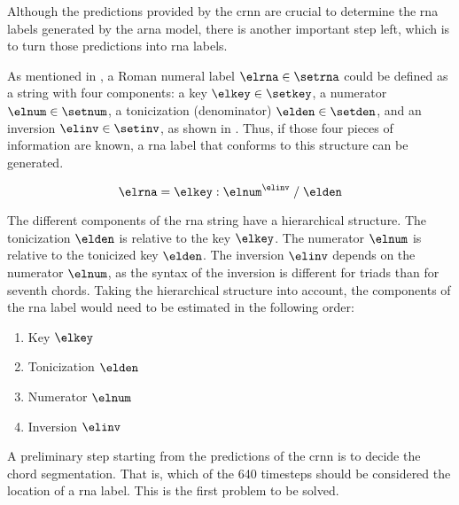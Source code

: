 
Although the predictions provided by the \gls{crnn} are
crucial to determine the \gls{rna} labels generated by the
\gls{arna} model, there is another important step left,
which is to turn those predictions into \gls{rna} labels.

As mentioned in
, a Roman
numeral label $\elrna \in \setrna$ could be defined as a
string with four components: a key $\elkey \in \setkey$, a
numerator $\elnum \in \setnum$, a tonicization (denominator)
$\elden \in \setden$, and an inversion $\elinv \in \setinv$,
as shown in . Thus, if those four pieces of
information are known, a \gls{rna} label that conforms to
this structure can be generated.

\begin{equation}
    \label{eq:rna}
    \elrna = \elkey : \elnum^{\elinv} \; / \; \elden
\end{equation}


The different components of the \gls{rna} string have a
hierarchical structure. The tonicization $\elden$ is
relative to the key $\elkey$. The numerator $\elnum$ is
relative to the tonicized key $\elden$. The inversion
$\elinv$ depends on the numerator $\elnum$, as the syntax of
the inversion is different for triads than for seventh
chords. Taking the hierarchical structure into account, the
components of the \gls{rna} label would need to be estimated
in the following order:

\begin{enumerate}
    \item Key $\elkey$
    \item Tonicization $\elden$
    \item Numerator $\elnum$
    \item Inversion $\elinv$
\end{enumerate}

A preliminary step starting from the predictions of the
\gls{crnn} is to decide the chord segmentation. That is,
which of the 640 timesteps should be considered the location
of a \gls{rna} label. This is the first problem to be
solved.


